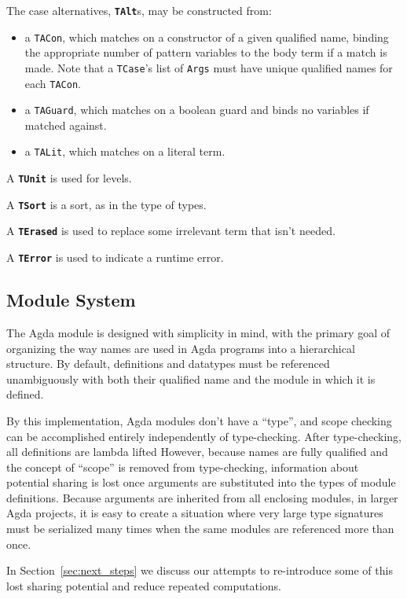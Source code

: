 The case alternatives, \textbf{\lstinline{TAlt}}s, may be constructed from:
\begin{itemize}
\item a \lstinline{TACon}, which matches on a constructor of a given qualified name, binding the appropriate number of pattern variables to the body term if a match is made. Note that a \lstinline{TCase}'s list of \lstinline{Args} must have unique qualified names for each \lstinline{TACon}.
\item a \lstinline{TAGuard}, which matches on a boolean guard and binds no variables if matched against.
\item a \lstinline{TALit}, which matches on a literal term.
\end{itemize}

A \textbf{\lstinline{TUnit}} is used for levels.

A \textbf{\lstinline{TSort}} is a sort, as in the type of types.

A \textbf{\lstinline{TErased}} is used to replace some irrelevant term that isn't needed.

A \textbf{\lstinline{TError}} is used to indicate a runtime error.

\subsection{Module System}

The Agda module is designed with simplicity in mind, with the primary goal of organizing the way names are used in Agda programs into a hierarchical structure. By default, definitions and datatypes must be referenced unambiguously with both their qualified name and the module in which it is defined.

By this implementation, Agda modules don't have a ``type'', and scope checking can be accomplished entirely independently of type-checking. After type-checking, all definitions are lambda lifted \cite{agdadocs} However, because names are fully qualified and the concept of ``scope'' is removed from type-checking, information about potential sharing is lost once arguments are substituted into the types of module definitions. Because arguments are inherited from all enclosing modules, in larger Agda projects, it is easy to create a situation where very large type signatures must be serialized many times when the same modules are referenced more than once.\cite{agdamail} %

In Section~\ref{sec:next_steps} we discuss our attempts to re-introduce some of this lost sharing potential and reduce repeated computations.
